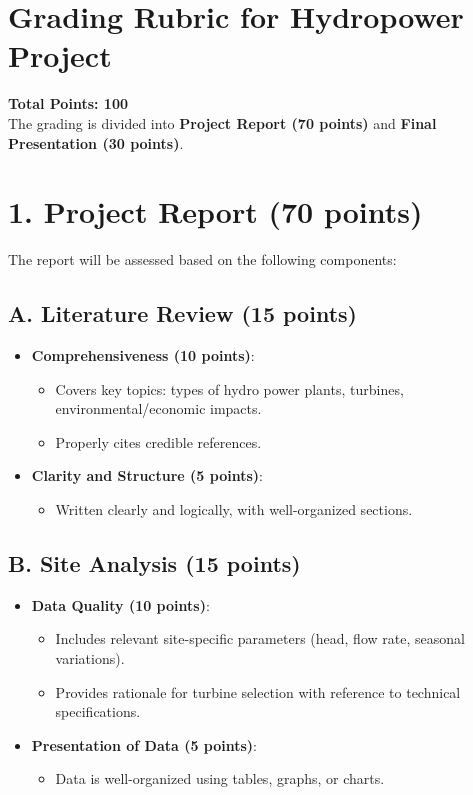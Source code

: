 \documentclass[11pt]{article}
\begin{document}
\section*{Grading Rubric for Hydropower Project}

\textbf{Total Points: 100}\\
The grading is divided into \textbf{Project Report (70 points)} and \textbf{Final Presentation (30 points)}.

\section*{1. Project Report (70 points)}
The report will be assessed based on the following components:

\subsection*{A. Literature Review (15 points)}
\begin{itemize}
    \item \textbf{Comprehensiveness (10 points)}:
    \begin{itemize}
        \item Covers key topics: types of hydro power plants, turbines, environmental/economic impacts.
        \item Properly cites credible references.
    \end{itemize}
    \item \textbf{Clarity and Structure (5 points)}:
    \begin{itemize}
        \item Written clearly and logically, with well-organized sections.
    \end{itemize}
\end{itemize}

\subsection*{B. Site Analysis (15 points)}
\begin{itemize}
    \item \textbf{Data Quality (10 points)}:
    \begin{itemize}
        \item Includes relevant site-specific parameters (head, flow rate, seasonal variations).
        \item Provides rationale for turbine selection with reference to technical specifications.
    \end{itemize}
    \item \textbf{Presentation of Data (5 points)}:
    \begin{itemize}
        \item Data is well-organized using tables, graphs, or charts.
    \end{itemize}
\end{itemize}
\end{document}
